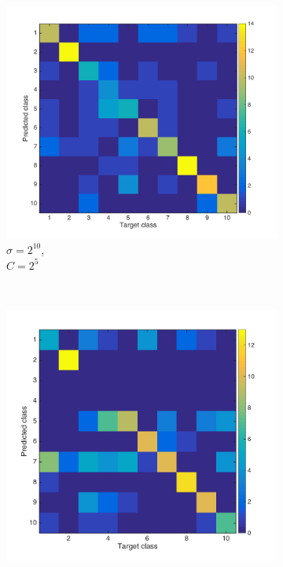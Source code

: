 \documentclass[10pt,twocolumn,letterpaper]{article}
\begin{document}
\begin{figure}
	
	\begin{subfigure}[H]{0.3 \columnwidth}
		\includegraphics[width = 1\columnwidth]{q3_confmat1}\hfill
		\caption{$\sigma = 2^{10}$, \\$C = 2^5$}
	\end{subfigure}
	~
	\begin{subfigure}[H]{0.3 \columnwidth}
		\includegraphics[width = 1\columnwidth]{q3_confmat2}

\end{subfigure}
\end{figure}
\end{document}
